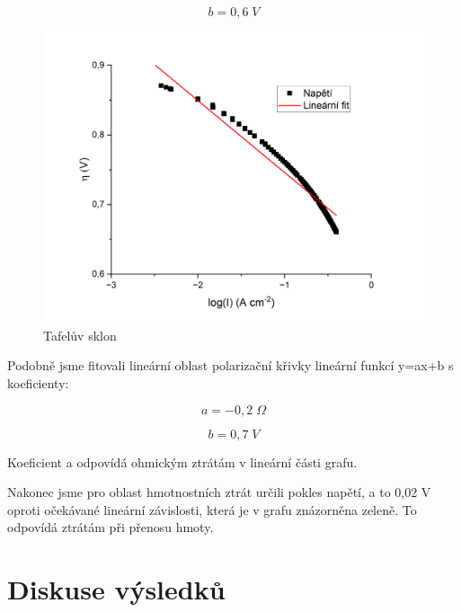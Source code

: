 \begin{equation}
    b = 0,6 \; V
\end{equation}

\begin{figure}[!h]
    \centering
    \includegraphics[width=1\linewidth]{H1 - vodíkový palivový článek//Tafelův sklon.png}
    \caption{Tafelův sklon}
    \label{fig:Tafelův-sklon}
\end{figure}

\newpage

Podobně jsme fitovali lineární oblast polarizační křivky lineární funkcí y=ax+b s koeficienty:

 \begin{equation}
     a = -0,2 \; \Omega
 \end{equation}

 \begin{equation}
     b = 0,7 \; V
 \end{equation}

Koeficient a odpovídá ohmickým ztrátám v lineární části grafu.

Nakonec jsme pro oblast hmotnostních ztrát určili pokles napětí, a to 0,02 V oproti očekávané lineární závislosti, která je v grafu znázorněna zeleně. To odpovídá ztrátám při přenosu hmoty.

    
\newpage
\section{Diskuse výsledků}

